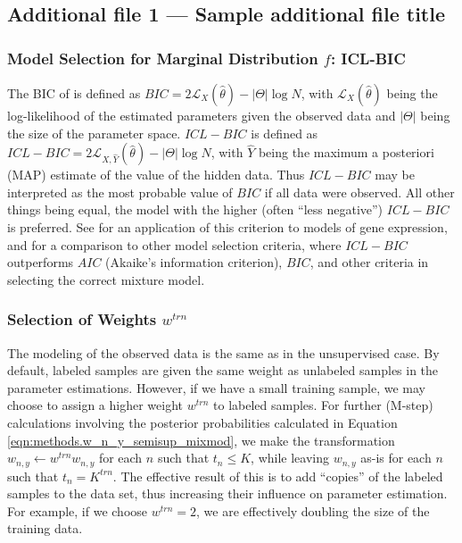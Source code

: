 \documentclass{bmcart}
\begin{document}
\begin{backmatter}
  \subsection*{Additional file 1 --- Sample additional file title}
   
   
\subsubsection*{Model Selection for Marginal Distribution $f$: ICL-BIC}
The BIC of \citep{Schwarz1978a}  is defined as $BIC= 2 \mathcal L_{X}(\hat\theta) - 
|\Theta| \log N$, with $\mathcal L_{X}(\hat\theta)$ being the log-likelihood of the estimated parameters given the 
observed data and $|\Theta|$ being the size of the parameter space. $ICL-BIC$ is defined as $ICL-BIC = 2 \mathcal L_{X, 
{\hat Y}}(\hat\theta) - |\Theta| \log N$, with $\hat Y$ being the maximum a posteriori (MAP) estimate of the value 
of the hidden data. Thus $ICL-BIC$ may be interpreted as the most probable value of $BIC$ if all data were observed.  All 
other things being equal, the model with the higher (often ``less negative'') $ICL-BIC$is preferred.  See \citep{Ji2005a} for 
an application of this criterion to models of gene expression, and \citep{Viroli2010a} for a comparison to other model 
selection criteria, where $ICL-BIC$ outperforms $AIC$ (Akaike's information criterion), $BIC$, and other criteria in selecting the correct mixture model.
   
 \subsubsection*{Selection of Weights $w^{trn}$}
The modeling of the observed data is the same as in the unsupervised case. By default, labeled samples are given the same 
weight as unlabeled samples in the parameter estimations.  However, if we  have a small training sample, we may choose to 
assign a higher weight $w^{trn}$ to labeled samples.   For further (M-step)  calculations involving the posterior probabilities 
calculated in Equation \eqref{eqn:methods.w_n_y_semisup_mixmod}, we  make the transformation $w_{n,y} \leftarrow w^{trn} 
w_{n,y}$ for each $n$ such that $t_n \leq K$, while leaving $w_{n,y}$  as-is for each $n$ such that $t_n = K^{trn}$.  The effective 
result of this is to add ``copies'' of the labeled samples to the  data set, thus increasing their influence on parameter estimation.  
For example, if we choose $w^{trn} = 2$, we are  effectively doubling the size of the training data.


\end{backmatter}
\end{document}
